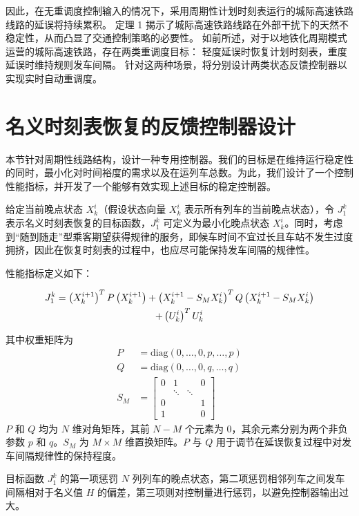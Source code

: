 因此，在无重调度控制输入的情况下，采用周期性计划时刻表运行的城际高速铁路线路的延误将持续累积。
定理 1 揭示了城际高速铁路线路在外部干扰下的天然不稳定性，从而凸显了交通控制策略的必要性。
如前所述，对于以地铁化周期模式运营的城际高速铁路，存在两类重调度目标：
轻度延误时恢复计划时刻表，重度延误时维持规则发车间隔。
针对这两种场景，将分别设计两类状态反馈控制器以实现实时自动重调度。

\section{名义时刻表恢复的反馈控制器设计}
\label{sec:guidelines}
本节针对周期性线路结构，设计一种专用控制器。我们的目标是在维持运行稳定性的同时，最小化对时间裕度的需求以及在运列车总数。为此，我们设计了一个控制性能指标，并开发了一个能够有效实现上述目标的稳定控制器。

给定当前晚点状态 $X_k^i$（假设状态向量 $X_k^i$ 表示所有列车的当前晚点状态），令 $J_{1}^{k}$ 表示名义时刻表恢复的目标函数，$J_{1}^{k}$ 可定义为最小化晚点状态 $X_k^i$。同时，考虑到“随到随走”型乘客期望获得规律的服务，即候车时间不宜过长且车站不发生过度拥挤，因此在恢复时刻表的过程中，也应尽可能保持发车间隔的规律性。

性能指标定义如下：
\begin{scriptsize}
	\begin{gather}
		J_{1}^{k}=\left(X_{k}^{i+1}\right)^{T} P\left(X_{k}^{i+1}\right)+\left(X_{k}^{i+1}-S_{M} X_{k}^{i}\right)^{T} Q\left(X_{k}^{i+1}-S_{M} X_{k}^{i}\right) \notag\\
		+\left(U_{k}^{i}\right)^{T} U_{k}^{i}
		\label{equ:equ18:opti1}
	\end{gather}
\end{scriptsize}
其中权重矩阵为
\begin{align*}
	P &= \text{diag}(0,\ldots,0,p,\ldots,p) \\
	Q &= \text{diag}(0,\ldots,0,q,\ldots,q) \\
	S_{M} &= \begin{bmatrix}
		0 & 1 & & 0 \\
		& \ddots & \ddots & \\
		0 & & & 1 \\
		1 & & & 0
	\end{bmatrix}
\end{align*}
$P$ 和 $Q$ 均为 $N$ 维对角矩阵，其前 $N-M$ 个元素为 0，其余元素分别为两个非负参数 $p$ 和 $q$。$S_M$ 为 $M \times M$ 维置换矩阵。$P$ 与 $Q$ 用于调节在延误恢复过程中对发车间隔规律性的保持程度。

目标函数 $J_1^k$ 的第一项惩罚 $N$ 列列车的晚点状态，第二项惩罚相邻列车之间发车间隔相对于名义值 $H$ 的偏差，第三项则对控制量进行惩罚，以避免控制器输出过大。

